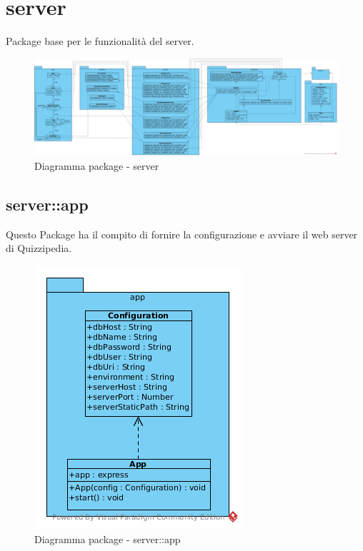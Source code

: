 \section{server}
Package base per le funzionalità del server.\begin{center}
		\begin{figure}[H]
			\centering \includegraphics[scale=4, max width=\textwidth, max height=\myheight]{../img/diagrammiClassi/server.png}
			\caption{Diagramma package - server}
		\end{figure}
	\end{center}\subsection{server::app}
Questo Package ha il compito di fornire la configurazione e avviare il web server di Quizzipedia.\begin{center}
		\begin{figure}[H]
			\centering \includegraphics[scale=4, max width=\textwidth, max height=\myheight]{../img/diagrammiClassi/server/app.png}
			\caption{Diagramma package - server::app}
		\end{figure}
	\end{center}\hypertarget{server::app::App}{}
